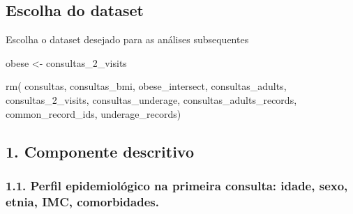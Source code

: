 \documentclass[
]{article}
\newenvironment{Shaded}{\begin{snugshade}}{\end{snugshade}}
\newcommand{\FunctionTok}[1]{\textcolor[rgb]{0.28,0.35,0.67}{#1}}
\newcommand{\NormalTok}[1]{\textcolor[rgb]{0.00,0.23,0.31}{#1}}
\newcommand{\OtherTok}[1]{\textcolor[rgb]{0.00,0.23,0.31}{#1}}
\begin{document}
\subsection{Escolha do dataset}\label{escolha-do-dataset}

Escolha o dataset desejado para as análises subsequentes

\begin{Shaded}
\begin{Highlighting}[]
\NormalTok{obese }\OtherTok{\textless{}{-}}\NormalTok{ consultas\_2\_visits}
\end{Highlighting}
\end{Shaded}

\begin{Shaded}
\begin{Highlighting}[]
\FunctionTok{rm}\NormalTok{(}
\NormalTok{  consultas, }
\NormalTok{  consultas\_bmi, }
\NormalTok{  obese\_intersect,}
\NormalTok{  consultas\_adults, }
\NormalTok{  consultas\_2\_visits, }
\NormalTok{  consultas\_underage, }
\NormalTok{  consultas\_adults\_records, }
\NormalTok{  common\_record\_ids, }
\NormalTok{  underage\_records)}
\end{Highlighting}
\end{Shaded}

\subsection{1. Componente descritivo}\label{componente-descritivo}

\subsubsection{1.1. Perfil epidemiológico na primeira consulta: idade,
sexo, etnia, IMC,
comorbidades.}\label{perfil-epidemioluxf3gico-na-primeira-consulta-idade-sexo-etnia-imc-comorbidades.}
\end{document}
